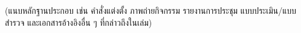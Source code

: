 \vspace{6pt}
\noindent (แนบหลักฐานประกอบ เช่น คำสั่งแต่งตั้ง ภาพถ่ายกิจกรรม รายงานการประชุม
แบบประเมิน/แบบสำรวจ และเอกสารอ้างอิงอื่น ๆ ที่กล่าวถึงในเล่ม)
